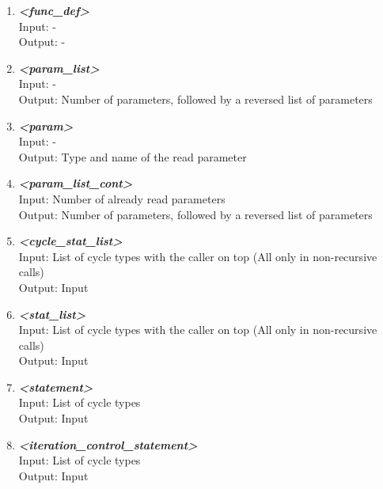 \documentclass[a4paper, 11pt]{article}
\begin{document}
\begin{enumerate}
\item \textbf{\textit{<func\_def>}} \\
Input: \hspace{3.288mm} - \\
Output: \enspace - 

\item \textbf{\textit{<param\_list>}} \\
Input: \hspace{3.288mm} - \\
Output: \enspace Number of parameters, followed by a reversed list of parameters

\item \textbf{\textit{<param>}} \\
Input: \hspace{3.288mm} - \\
Output: \enspace Type and name of the read parameter

\item \textbf{\textit{<param\_list\_cont>}} \\
Input: \hspace{3.288mm} Number of already read parameters \\
Output: \enspace Number of parameters, followed by a reversed list of parameters

\item \textbf{\textit{<cycle\_stat\_list>}} \\
Input: \hspace{3.288mm} List of cycle types with the caller on top (All only in non-recursive calls) \\
Output: \enspace Input

\item \textbf{\textit{<stat\_list>}} \\
Input: \hspace{3.288mm} List of cycle types with the caller on top (All only in non-recursive calls) \\
Output: \enspace Input

\item \textbf{\textit{<statement>}} \\
Input: \hspace{3.288mm} List of cycle types \\
Output: \enspace Input

\item \textbf{\textit{<iteration\_control\_statement>}} \\
Input: \hspace{3.288mm} List of cycle types \\
Output: \enspace Input


\end{enumerate}
\end{document}
